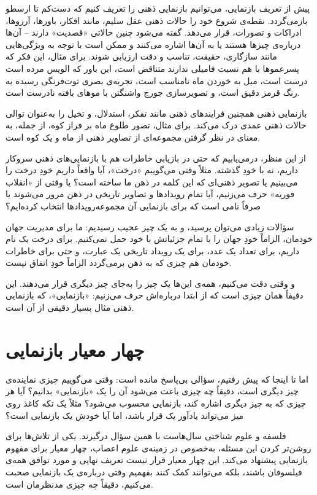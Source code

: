 پیش از تعریف بازنمایی، می‌توانیم بازنمایی ذهنی را تعریف کنیم که دست‌کم تا ارسطو بازمی‌گردد. نقطه‌ی شروع خود را حالات ذهنی عقل سلیم، مانند افکار، باورها، آرزوها، ادراکات و تصورات، قرار می‌دهد. گفته می‌شود چنین حالاتی «قصدیت» دارند -- آن‌ها درباره‌ی چیزها هستند یا به آن‌ها اشاره می‌کنند و ممکن است با توجه به ویژگی‌هایی مانند سازگاری، حقیقت، تناسب و دقت ارزیابی شوند. برای مثال، این فکر که پسرعموها با هم نسبت فامیلی ندارند متناقض است، این باور که الویس مرده است درست است، میل به خوردن ماه نامناسب است، تجربه‌ی بصری توت‌فرنگی رسیده به رنگ قرمز دقیق است، و تصویرسازی جورج واشنگتن با موهای بافته نادرست است\autocite{sep-mental-representation}.

بازنمایی ذهنی همچنین فرایندهای ذهنی مانند تفکر، استدلال، و تخیل را به‌عنوان توالی حالات ذهنی عمدی درک می‌کند. برای مثال، تصور طلوع ماه بر فراز کوه، از جمله، به معنای در نظر گرفتن مجموعه‌ای از تصاویر ذهنی از ماه و یک کوه است\autocite{sep-mental-representation}.

از این منظر، درمی‌یابیم که حتی در بازیابی خاطرات هم با بازنمایی‌های ذهنی سروکار داریم، نه با خودِ گذشته. مثلاً وقتی می‌گوییم «درخت»، آیا واقعاً داریم خودِ درخت را می‌بینیم یا تصویر ذهنی‌ای که این کلمه در ذهن ما ساخته است؟ یا وقتی از «انقلاب فوریه» حرف می‌زنیم، آیا تمام رویدادها و تصاویر تاریخی در ذهن مرور می‌شوند یا صرفاً نامی است که برای بازنمایی آن مجموعه‌رویدادها انتخاب کرده‌ایم؟

سؤالات زیادی می‌توان پرسید، و به یک چیز عجیب رسیدیم: ما برای مدیریت جهان خودمان، الزاماً خودِ جهان را با تمام جزئیاتش با خود حمل نمی‌کنیم. برای درخت یک نام داریم، برای تعداد یک عدد، برای یک رویداد تاریخی یک عبارت، و حتی برای خاطرات خودمان هم چیزی که به ذهن برمی‌گردد الزاماً خودِ اتفاق نیست.

و وقتی دقت می‌کنیم، همه‌ی این‌ها یک چیز را به‌جای چیز دیگری قرار می‌دهند. این دقیقاً همان چیزی است که از ابتدا درباره‌اش حرف می‌زنیم: «بازنمایی»، که بازنمایی ذهنی مثال بسیار دقیقی از آن است.

\section{چهار معیار بازنمایی}
\label{sec:four-criteria-representation}

اما تا اینجا که پیش رفتیم، سؤالی بی‌پاسخ مانده است: وقتی می‌گوییم چیزی نماینده‌ی چیز دیگری است، دقیقاً چه چیزی باعث می‌شود آن را یک «بازنمایی» بدانیم؟ آیا هر چیزی که به چیز دیگری اشاره کند، بازنمایی محسوب می‌شود؟ مثلاً یک تکه کاغذ روی میز می‌تواند یادآور یک قرار باشد، اما آیا خودش یک بازنمایی است؟

فلسفه و علوم شناختی سال‌هاست با همین سؤال درگیرند. یکی از تلاش‌ها برای روشن‌تر کردن این مسئله، به‌خصوص در زمینه‌ی علوم اعصاب، چهار معیار برای مفهوم بازنمایی پیشنهاد می‌کند\autocite{baker2021representation}. این چهار معیار قرار نیست تعریف نهایی و مورد توافق همه‌ی فیلسوفان باشند، بلکه می‌توانند کمک کنند بفهمیم وقتی درباره‌ی یک بازنمایی صحبت می‌کنیم، دقیقاً چه چیزی مدنظرمان است.
\newpage

